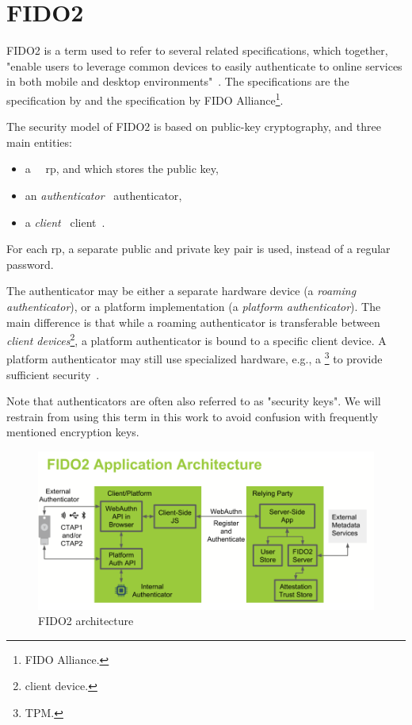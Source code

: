 \section{FIDO2}\label{sec:fido2}

FIDO2 is a term used to refer to several related specifications, which together,
"enable users to leverage common devices to easily authenticate to online services in both mobile and desktop environments"~\cite{fido:fido2}.
The specifications are the  specification by 
and the  specification by FIDO Alliance\footnote{\Glsdesc{FIDO Alliance}.}.

The security model of FIDO2 is based on public-key cryptography,
and three main entities:

\begin{itemize}
	\item a \emph{}\ \textendash\ \glsdesc{rp}, and which stores the public key,
	\item an \emph{\gls{authenticator}} \textendash\ \glsdesc{authenticator},
	\item a \emph{\gls{client}} \textendash\ \glsdesc{client}~\cite{fido:webautn}.
\end{itemize}

For each \gls{rp}, a separate public and private key pair is used, instead of a regular
password.

The \gls{authenticator} may be either a separate hardware device (a \emph{\gls{roaming authenticator}}),
or a platform implementation (a \emph{\gls{platform authenticator}}).
The main difference is that while a \gls{roaming authenticator} is transferable between
\emph{\glspl{client device}}\footnote{\Glsdesc{client device}.},
a \gls{platform authenticator} is bound to a specific \gls{client device}.
A \gls{platform authenticator} may still use specialized hardware, e.g., a \footnote{\Glsdesc{TPM}.}
to provide sufficient security~\cite{fido:webautn}.

Note that authenticators are often also referred to as "security keys". We will restrain
from using this term in this work to avoid confusion with frequently mentioned encryption keys.

\begin{figure}[H]
	\centering\includegraphics[width=\textwidth]{images/fido2-app-architecture}

	\caption[FIDO2 architecture]
	{FIDO2 architecture~\protect\cite{yubico:webauthn}}
	\label{fig:fido2-architecture}
\end{figure}

